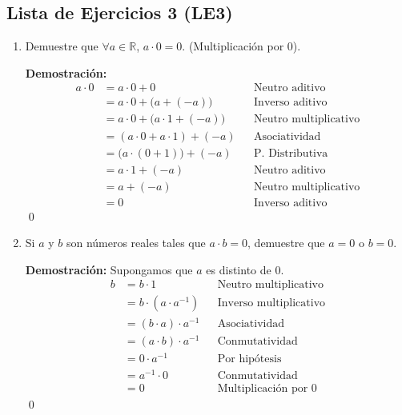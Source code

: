 \documentclass[11pt]{article}
\newcommand{\R}{\mathbb{R}}
\begin{document}
\subsection*{Lista de Ejercicios 3 (LE3)}
    \begin{enumerate}[label=\alph*)]

        \item Demuestre que $\forall a\in \R$, $a \cdot 0 = 0$. (Multiplicación por $0$).
        
        \textbf{Demostración:}
        \begin{align*}
            a\cdot0&=a\cdot0+0 && \text{Neutro aditivo}\\
            &=a\cdot0+\bigl(a+\left(-a\right)\bigr) && \text{Inverso aditivo}\\
            &=a\cdot0+\bigl(a\cdot1+\left(-a\right)\bigr) && \text{Neutro multiplicativo}\\
            &=\left(a\cdot0+a\cdot1\right)+\left(-a\right) && \text{Asociatividad}\\
            &=\bigl(a\cdot\left(0+1\right)\bigr)+\left(-a\right) && \text{P. Distributiva}\\
            &=a\cdot1+\left(-a\right) && \text{Neutro aditivo}\\
            &=a+\left(-a\right) && \text{Neutro multiplicativo}\\
            &=0 && \text{Inverso aditivo}
        \end{align*} \qed

        \item Si $a$ y $b$ son números reales tales que $ a \cdot b = 0 $, demuestre que $a=0$ o $b=0$.
        
        \textbf{Demostración:} Supongamos que $a$ es distinto de $0$.
        \begin{align*}
            b &= b \cdot 1	&& \text{Neutro multiplicativo} \\
            &= b \cdot  \left(a \cdot a^{-1}  \right) 	&& \text{Inverso multiplicativo} \\
            &= \left(b\cdot a\right)  \cdot a^{-1}	&& \text{Asociatividad} \\
            &= \left(a\cdot b\right)  \cdot a^{-1}	&& \text{Conmutatividad} \\
            &= 0 \cdot a^{-1}	&& \text{Por hipótesis}\\
            &= a^{-1} \cdot 0	&& \text{Conmutatividad}\\
            &= 0 && \text{Multiplicación por $0$}
        \end{align*} \qed


\end{enumerate}
\end{document}
